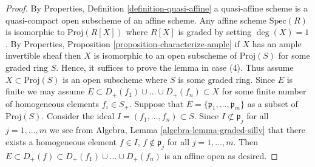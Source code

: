 \begin{proof}
By Properties, Definition \ref{definition-quasi-affine}
a quasi-affine scheme is a quasi-compact open subscheme
of an affine scheme. Any affine scheme $\text{Spec}(R)$ is isomorphic to
$\text{Proj}(R[X])$ where $R[X]$ is graded by setting $\deg(X) = 1$.
By Properties, Proposition \ref{proposition-characterize-ample}
if $X$ has an ample invertible sheaf then $X$ is isomorphic to an open
subscheme of $\text{Proj}(S)$ for some graded ring $S$.
Hence, it suffices to prove the lemma in case (4).
Thus assume $X \subset \text{Proj}(S)$ is an open subscheme
where $S$ is some graded ring. Since $E$ is finite we may assume
$E \subset D_{+}(f_1) \cup \ldots \cup D_{+}(f_n) \subset X$
for some finite number of homogeneous elements $f_i \in S_{+}$.
Suppose that $E = \{\mathfrak p_1, \ldots, \mathfrak p_m\}$
as a subset of $\text{Proj}(S)$.
Consider the ideal $I = (f_1, \ldots, f_n) \subset S$.
Since $I \not \subset \mathfrak p_j$ for all $j = 1, \ldots, m$
we see from Algebra, Lemma \ref{algebra-lemma-graded-silly} that
there exists a homogeneous element $f \in I$, $f \not \in \mathfrak p_j$
for all $j = 1, \ldots, m$. Then $E \subset D_{+}(f) \subset
D_{+}(f_1) \cup \ldots \cup D_{+}(f_n)$ is an affine open as desired.
\end{proof}



















